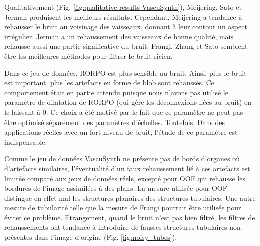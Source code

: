 Qualitativement (Fig. \ref{fig:qualitative results VascuSynth}), Meijering, Sato et Jerman produisent les meilleurs résultats. Cependant, Meijering a tendance à rehausser le bruit au voisinage des vaisseaux, donnant à leur contour un aspect irrégulier. Jerman a un rehaussement des vaisseaux de bonne qualité, mais rehausse aussi une partie significative du bruit. Frangi, Zhang et Sato semblent être les meilleures méthodes pour filtrer le bruit ricien. 


Dans ce jeu de données, RORPO est plus sensible au bruit. Ainsi, plus le bruit est important, plus les artefacts en forme de blob sont rehaussés. 
Ce comportement était en partie attendu puisque nous n'avons pas utilisé le paramètre de dilatation de RORPO (qui gère les déconnexions liées au bruit) en le laissant à 0. Ce choix a été motivé par le fait que ce paramètre ne peut pas être optimisé séparément des paramètres d'échelles. Toutefois, Dans des applications réelles avec un fort niveau de bruit, l'étude de ce paramètre est indispensable. 

Comme le jeu de données VascuSynth ne présente pas de bords d'organes où d'artefacts similaires, l'éventualité d'un faux rehaussement lié à ces artefacts est limitée comparé aux jeux de données réels, excepté pour OOF qui rehausse les bordures de l'image assimilées à des plans. La mesure utilisée pour OOF distingue en effet mal les structures planaires des structures tubulaires. Une autre mesure de tubularité telle que la mesure de Frangi pourrait être utilisée pour éviter ce problème. Etrangement, quand le bruit n'est pas bien filtré, les filtres de rehaussements ont tendance à introduire de fausses structures tubulaires non présentes dans l'image d'origine (Fig. \ref{fig:noisy_tubes}).

